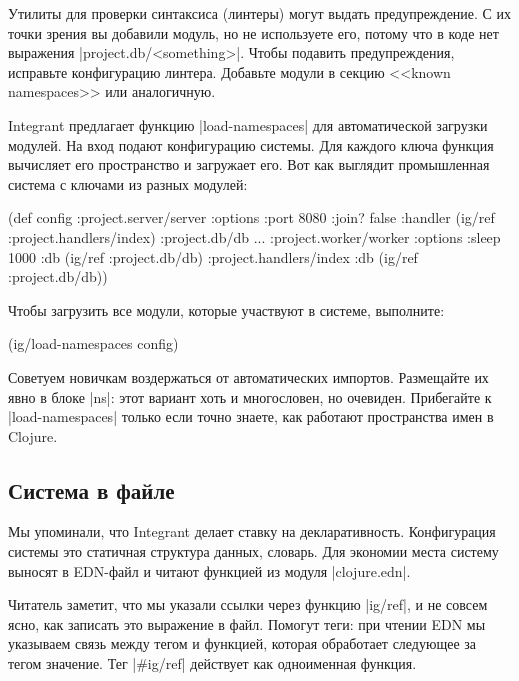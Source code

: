 Утилиты для проверки синтаксиса (линтеры) могут выдать предупреждение. С их
точки зрения вы добавили модуль, но не используете его, потому что в коде нет
выражения \spverb|project.db/<something>|. Чтобы подавить предупреждения,
исправьте конфигурацию линтера. Добавьте модули в секцию <<known namespaces>>
или аналогичную.

Integrant предлагает функцию \spverb|load-namespaces| для
автоматической загрузки модулей. На вход подают конфигурацию системы. Для
каждого ключа функция вычисляет его пространство и загружает его. Вот как
выглядит промышленная система с ключами из разных модулей:

\begin{english}
  \begin{clojure}
(def config
  {:project.server/server
   {:options {:port 8080 :join? false}
    :handler (ig/ref :project.handlers/index)}
   :project.db/db {...}
   :project.worker/worker
   {:options {:sleep 1000}
    :db      (ig/ref :project.db/db)}
   :project.handlers/index
   {:db (ig/ref :project.db/db)}})
  \end{clojure}
\end{english}

Чтобы загрузить все модули, которые участвуют в системе, выполните:

\begin{english}
  \begin{clojure}
(ig/load-namespaces config)
  \end{clojure}
\end{english}

Советуем новичкам воздержаться от автоматических импортов. Размещайте их явно в
блоке \spverb|ns|: этот вариант хоть и многословен, но очевиден. Прибегайте к
\spverb|load-namespaces| только если точно знаете, как работают пространства
имен в Clojure.

\subsection{Система в файле}

Мы упоминали, что Integrant делает ставку на
декларативность. Конфигурация системы это статичная структура данных,
словарь. Для экономии места систему выносят в EDN-файл и читают функцией из
модуля \spverb|clojure.edn|.

Читатель заметит, что мы указали ссылки через функцию \spverb|ig/ref|, и не
совсем ясно, как записать это выражение в файл. Помогут теги: при чтении EDN мы
указываем связь между тегом и функцией, которая обработает следующее за тегом
значение. Тег \spverb|#ig/ref| действует как одноименная функция.


